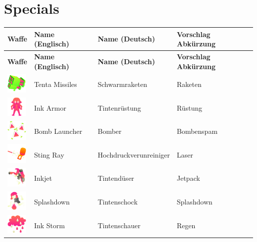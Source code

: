 \documentclass{scrreprt}
\begin{document}
\section{Specials}
\begin{center}
	\begin{longtable}{|m{3.5cm}|m{4cm}|m{4cm}|m{2cm}|}
		\hline
		\textbf{Waffe} & \textbf{Name (Englisch)} & \textbf{Name (Deutsch)} & \textbf{Vorschlag Abkürzung} \\ \hline
		\hline
		\endfirsthead
		\hline
		\textbf{Waffe} & \textbf{Name (Englisch)} & \textbf{Name (Deutsch)} & \textbf{Vorschlag Abkürzung} \\ \hline
		\hline
		\endhead
		\hline
		\includegraphics[height=1cm]{img/tentamissiles.png} & Tenta Missiles & Schwarmraketen & Raketen \\ \hline
		\includegraphics[height=1cm]{img/inkarmor.png} & Ink Armor & Tintenrüstung & Rüstung \\ \hline
		\includegraphics[height=1cm]{img/bomblauncher.png} & Bomb Launcher & Bomber & Bombenspam \\ \hline
		\includegraphics[height=1cm]{img/stingray.png} & Sting Ray & Hochdruckverunreiniger & Laser \\ \hline
		\includegraphics[height=1cm]{img/inkjet.png} & Inkjet & Tintendüser & Jetpack \\ \hline
		\includegraphics[height=1cm]{img/splashdown.png} & Splashdown & Tintenschock & Splashdown \\ \hline
		\includegraphics[height=1cm]{img/inkstorm.png} & Ink Storm & Tintenschauer & Regen \\ \hline

\end{longtable}
\end{center}
\end{document}
